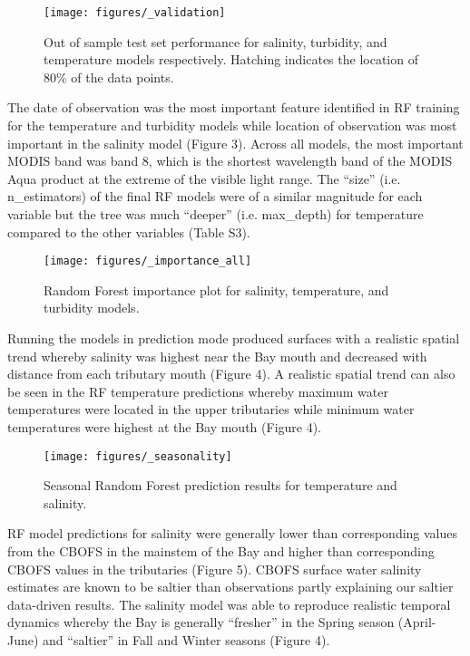 \documentclass{article}
\begin{document}
\begin{figure}[ht!]
    \begin{center}
          \texttt{[image: figures/\_validation]}
          \caption{Out of sample test set performance for salinity, turbidity, and temperature models respectively. Hatching indicates the location of 80\% of the data points.}
    \end{center}    
\end{figure}

The date of observation was the most important feature identified in RF training for the temperature and turbidity models while location of observation was most important in the salinity model (Figure 3). Across all models, the most important MODIS band was band 8, which is the shortest wavelength band of the MODIS Aqua product at the extreme of the visible light range. The “size” (i.e. n\_estimators) of the final RF models were of a similar magnitude for each variable but the tree was much “deeper” (i.e. max\_depth) for temperature compared to the other variables (Table S3).

\begin{figure}[ht!]
    \begin{center}
          \texttt{[image: figures/\_importance\_all]}
          \caption{Random Forest importance plot for salinity, temperature, and turbidity models.}
    \end{center}    
\end{figure}

Running the models in prediction mode produced surfaces with a realistic spatial trend whereby salinity was highest near the Bay mouth and decreased with distance from each tributary mouth (Figure 4). A realistic spatial trend can also be seen in the RF temperature predictions whereby maximum water temperatures were located in the upper tributaries while minimum water temperatures were highest at the Bay mouth (Figure 4).

\begin{figure}[ht!]
    \begin{center}
          \texttt{[image: figures/\_seasonality]}
          \caption{Seasonal Random Forest prediction results for temperature and salinity.}
    \end{center}    
\end{figure}

RF model predictions for salinity were generally lower than corresponding values from the CBOFS in the mainstem of the Bay and higher than corresponding CBOFS values in the tributaries (Figure 5). CBOFS surface water salinity estimates are known to be saltier than observations \cite{lanerolle2011second, vogelAssessingSatelliteSea2016} partly explaining our saltier data-driven results. The salinity model was able to reproduce realistic temporal dynamics whereby the Bay is generally “fresher” in the Spring season (April-June) and “saltier” in Fall and Winter seasons (Figure 4).
\end{document}
